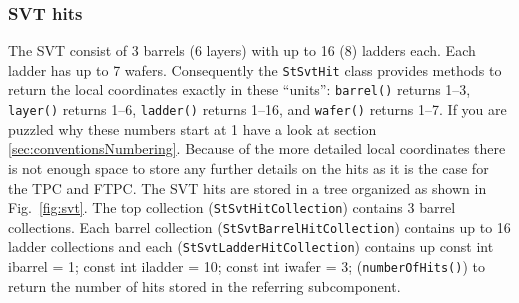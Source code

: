 \documentclass[twoside]{article}
\begin{document}
\subsubsection{SVT hits}
   
 

The SVT consist of 3 barrels (6 layers) with up to 16 (8) ladders
each. Each ladder has up to 7 wafers. Consequently the
\texttt{StSvtHit} class provides methods to return the local
coordinates exactly in these ``units'': \texttt{barrel()} returns
1--3, \texttt{layer()} returns 1--6, \texttt{ladder()} returns 1--16,
and \texttt{wafer()} returns 1--7. If you are puzzled why these
numbers start at 1 have a look at section
\ref{sec:conventionsNumbering}.  Because of the more detailed local
coordinates there is not enough space to store any further details on
the hits as it is the case for the TPC and FTPC.  The SVT hits are
stored in a tree organized as shown in Fig.~\ref{fig:svt}.  The top
collection (\texttt{StSvtHitCollection}) contains 3 barrel
collections.  Each barrel collection
(\texttt{StSvtBarrelHitCollection}) contains up to 16 ladder
collections and each (\texttt{StSvtLadderHitCollection}) contains up
const int ibarrel  = 1;
const int iladder  = 10;
const int iwafer   = 3;
(\texttt{numberOfHits()}) to return the number of hits stored in the
referring subcomponent. 
\end{document}
